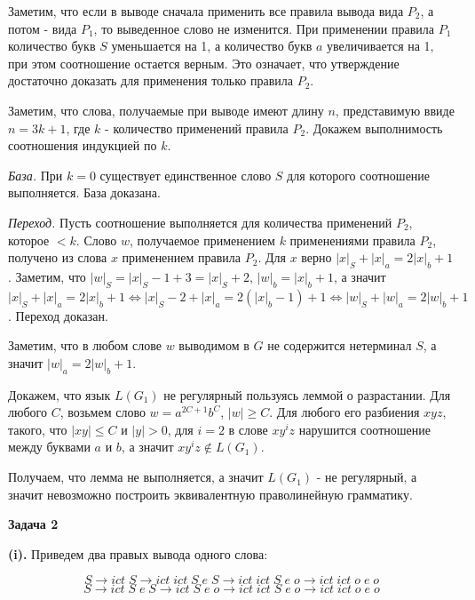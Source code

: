 \documentclass[10pt]{article}
\begin{document}
Заметим, что если в выводе сначала применить все правила вывода вида $P_2$, а потом - вида $P_1$, то выведенное слово не изменится. При применении правила $P_1$ количество букв $S$ уменьшается на 1, а количество букв $a$ увеличивается на 1, при этом соотношение остается верным. Это означает, что утверждение достаточно доказать для применения только правила $P_2$.

Заметим, что слова, получаемые при выводе имеют длину $n$, представимую ввиде $n = 3k + 1$, где $k$ - количество применений правила $P_2$. Докажем выполнимость соотношения индукцией по $k$.

{\it База.} При $k = 0$ существует единственное слово $S$ для которого соотношение выполняется. База доказана.

{\it Переход.} Пусть соотношение выполняется для количества применений $P_2$, которое $< k$. Слово $w$, получаемое применением $k$ применениями правила $P_2$, получено из слова $x$ применением правила $P_2$. Для $x$ верно $|x|_S + |x|_a = 2|x|_b + 1$. Заметим, что $|w|_S = |x|_S - 1 + 3 = |x|_S + 2$, $|w|_b = |x|_b + 1$, а значит $|x|_S + |x|_a = 2|x|_b + 1 \Leftrightarrow |x|_S - 2 + |x|_a = 2(|x|_b - 1) + 1 \Leftrightarrow |w|_S + |w|_a = 2|w|_b + 1$. Переход доказан.

\smallskip

Заметим, что в любом слове $w$ выводимом в $G$ не содержится нетерминал $S$, а значит $|w|_a = 2|w|_b + 1$.

Докажем, что язык $L(G_1)$ не регулярный пользуясь леммой о разрастании. Для любого $C$, возьмем слово $w = a^{2C + 1} b^{C}$, $|w| \geq C$. Для любого его разбиения $xyz$, такого, что $|xy| \leq C$ и $|y| > 0$, для $i = 2$ в слове $x y^i z$ нарушится соотношение между буквами $a$ и $b$, а значит $x y^i z \notin L(G_1)$.

Получаем, что лемма не выполняется, а значит $L(G_1)$ - не регулярный, а значит невозможно построить эквивалентную праволинейную грамматику.

\medskip

{\bf Задача 2}

{\bf (i).} Приведем два правых вывода одного слова:

$$S \rightarrow ict \; S \rightarrow ict \; ict \; S \; e \; S \rightarrow ict \; ict \; S \; e \; o \rightarrow ict \; ict \; o \; e \; o$$
$$S \rightarrow ict \; S \; e \; S \rightarrow ict \; S \; e \; o \rightarrow ict \; ict \; S \; e \; o \rightarrow ict \; ict \; o \; e \; o$$

\smallskip
\end{document}
